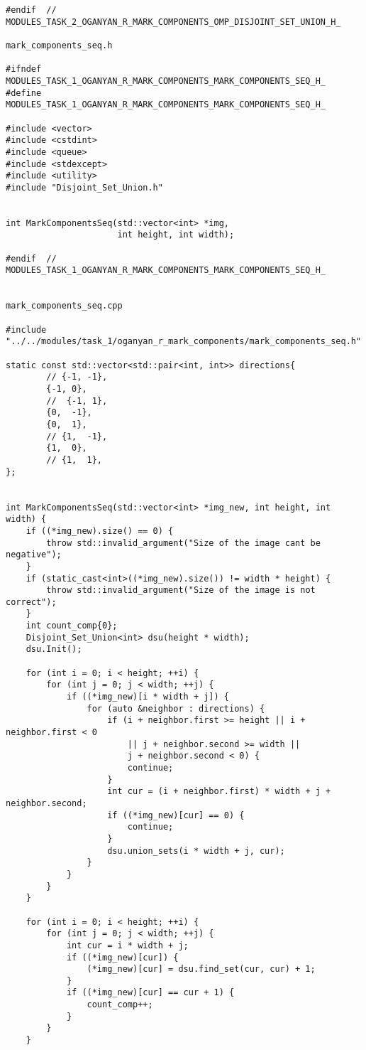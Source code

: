 \documentclass{report}
\begin{document}
\begin{lstlisting}
#endif  //  MODULES_TASK_2_OGANYAN_R_MARK_COMPONENTS_OMP_DISJOINT_SET_UNION_H_

mark_components_seq.h

#ifndef MODULES_TASK_1_OGANYAN_R_MARK_COMPONENTS_MARK_COMPONENTS_SEQ_H_
#define MODULES_TASK_1_OGANYAN_R_MARK_COMPONENTS_MARK_COMPONENTS_SEQ_H_

#include <vector>
#include <cstdint>
#include <queue>
#include <stdexcept>
#include <utility>
#include "Disjoint_Set_Union.h"


int MarkComponentsSeq(std::vector<int> *img,
                      int height, int width);

#endif  //  MODULES_TASK_1_OGANYAN_R_MARK_COMPONENTS_MARK_COMPONENTS_SEQ_H_


mark_components_seq.cpp

#include "../../modules/task_1/oganyan_r_mark_components/mark_components_seq.h"

static const std::vector<std::pair<int, int>> directions{
        // {-1, -1},
        {-1, 0},
        //  {-1, 1},
        {0,  -1},
        {0,  1},
        // {1,  -1},
        {1,  0},
        // {1,  1},
};


int MarkComponentsSeq(std::vector<int> *img_new, int height, int width) {
    if ((*img_new).size() == 0) {
        throw std::invalid_argument("Size of the image cant be negative");
    }
    if (static_cast<int>((*img_new).size()) != width * height) {
        throw std::invalid_argument("Size of the image is not correct");
    }
    int count_comp{0};
    Disjoint_Set_Union<int> dsu(height * width);
    dsu.Init();

    for (int i = 0; i < height; ++i) {
        for (int j = 0; j < width; ++j) {
            if ((*img_new)[i * width + j]) {
                for (auto &neighbor : directions) {
                    if (i + neighbor.first >= height || i + neighbor.first < 0
                        || j + neighbor.second >= width ||
                        j + neighbor.second < 0) {
                        continue;
                    }
                    int cur = (i + neighbor.first) * width + j + neighbor.second;
                    if ((*img_new)[cur] == 0) {
                        continue;
                    }
                    dsu.union_sets(i * width + j, cur);
                }
            }
        }
    }

    for (int i = 0; i < height; ++i) {
        for (int j = 0; j < width; ++j) {
            int cur = i * width + j;
            if ((*img_new)[cur]) {
                (*img_new)[cur] = dsu.find_set(cur, cur) + 1;
            }
            if ((*img_new)[cur] == cur + 1) {
                count_comp++;
            }
        }
    }


\end{lstlisting}
\end{document}
